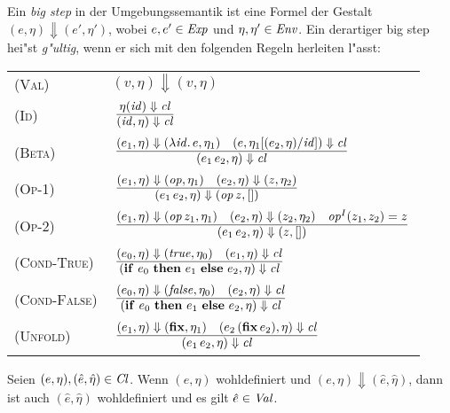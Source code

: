 \documentclass[12pt,fleqn]{article}
\newcommand{\RN}[1]{\mbox{\textsc{(#1)}}}
\newcommand{\Cl}{\name{Cl}}
\newcommand{\cl}{\name{cl}}
\begin{document}
\begin{definition}
Ein {\em big step} in der Umgebungssemantik ist eine Formel der Gestalt $(e,\eta) \Downarrow (e',\eta')$,
wobei $e,e'\in{\text{\it Exp\/}}$ und $\eta,\eta'\in{\text{\it Env\/}}$. Ein derartiger big step hei"st {\em g"ultig}, wenn er sich mit den
folgenden Regeln herleiten l"asst: \\[5mm]
\begin{tabular}{ll}
  \RN{Val}        & $(v,\eta) \Downarrow (v,\eta)$ \\[3mm]
  \RN{Id}         & $\regel{\eta(\id) \Downarrow \cl}
                           {(\id,\eta) \Downarrow \cl}$ \\[3mm]
  \RN{Beta}       & $\regel{(e_1,\eta) \Downarrow (\abstr{\id}{e},\eta_1)
                            \quad (e,\eta_1[(e_2,\eta)/\id]) \Downarrow \cl}
                           {(\app{e_1}{e_2},\eta) \Downarrow \cl}$ \\[3mm]
  \RN{Op-1}       & $\regel{(e_1,\eta) \Downarrow (\op,\eta_1) \quad (e_2,\eta) \Downarrow (z,\eta_2)}
                           {(\app{e_1}{e_2},\eta) \Downarrow (\app{\op}{z},[])}$ \\[3mm]
  \RN{Op-2}       & $\regel{(e_1,\eta) \Downarrow (\app{\op}{z_1},\eta_1)
                            \quad (e_2,\eta) \Downarrow (z_2,\eta_2)
                            \quad \op^I(z_1,z_2) = z}
                           {(\app{e_1}{e_2},\eta) \Downarrow (z,[])}$ \\[3mm]
  \RN{Cond-True}  & $\regel{(e_0,\eta) \Downarrow (\true,\eta_0) \quad (e_1,\eta) \Downarrow \cl}
                           {(\bifte{e_0}{e_1}{e_2},\eta) \Downarrow \cl}$ \\[3mm]
  \RN{Cond-False} & $\regel{(e_0,\eta) \Downarrow (\false,\eta_0) \quad (e_2,\eta) \Downarrow \cl}
                           {(\bifte{e_0}{e_1}{e_2},\eta) \Downarrow \cl}$ \\[3mm]
  \RN{Unfold}     & $\regel{(e_1,\eta) \Downarrow (\bfix,\eta_1)
                            \quad (\app{e_2}{(\app{\bfix}{e_2})},\eta) \Downarrow \cl}
                           {(\app{e_1}{e_2},\eta) \Downarrow \cl}$
\end{tabular}
\end{definition}

\begin{lemma} \label{lemma:Wohldefiniertheit}
  Seien $(e,\eta),(\hat{e},\hat{\eta})\in\Cl$. Wenn $(e,\eta)$ wohldefiniert und
  $(e,\eta) \Downarrow (\hat{e},\hat{\eta})$, dann ist auch $(\hat{e},\hat{\eta})$
  wohldefiniert und es gilt $\hat{e}\in {\text{\it Val\/}}$.
\end{lemma}
\end{document}
